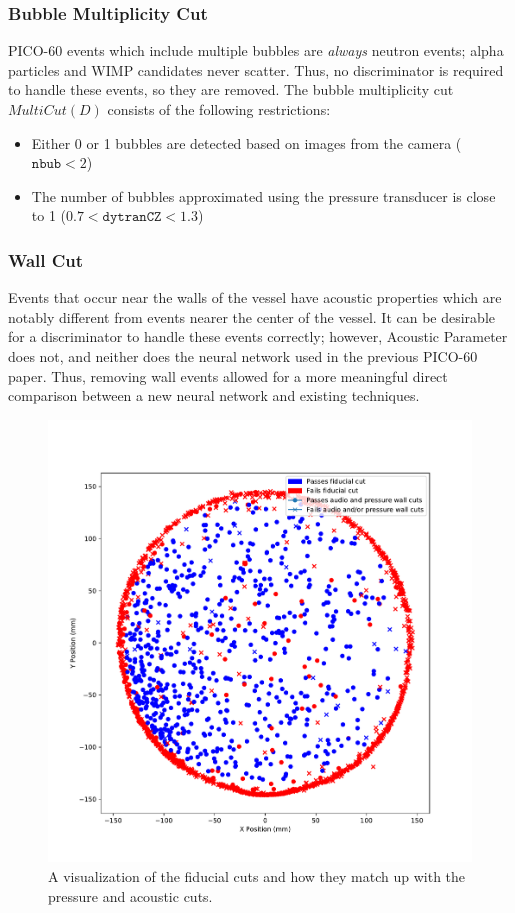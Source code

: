 \documentclass[10pt]{article}
\begin{document}
\subsubsection{Bubble Multiplicity Cut}

PICO-60 events which include multiple bubbles are \textit{always} neutron events; alpha particles and WIMP candidates never scatter. Thus, no discriminator is required to handle these events, so they are removed. The bubble multiplicity cut $MultiCut(D)$ consists of the following restrictions:

\begin{itemize}
    \item Either 0 or 1 bubbles are detected based on images from the camera ($\texttt{nbub}<2$)
    \item The number of bubbles approximated using the pressure transducer is close to 1 ($0.7<\texttt{dytranCZ}<1.3$)
\end{itemize}

\subsubsection{Wall Cut}

Events that occur near the walls of the vessel have acoustic properties which are notably different from events nearer the center of the vessel. It can be desirable for a discriminator to handle these events correctly; however, Acoustic Parameter does not, and neither does the neural network used in the previous PICO-60 paper. Thus, removing wall events allowed for a more meaningful direct comparison between a new neural network and existing techniques.

\begin{figure}[h!]
    \centering
    \includegraphics[width=\textwidth]{wall_event_positions}
    \caption{\label{} A visualization of the fiducial cuts and how they match up with the pressure and acoustic cuts.}
\end{figure}
\end{document}
